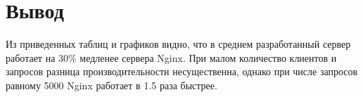 \section*{Вывод}
Из приведенных таблиц и графиков видно, что в среднем разработанный сервер работает на 30\% медленее 
сервера Nginx. При малом количество клиентов и запросов разница производительности несущественна, 
однако при числе запросов равному 5000 Nginx работает в 1.5 раза быстрее. 
